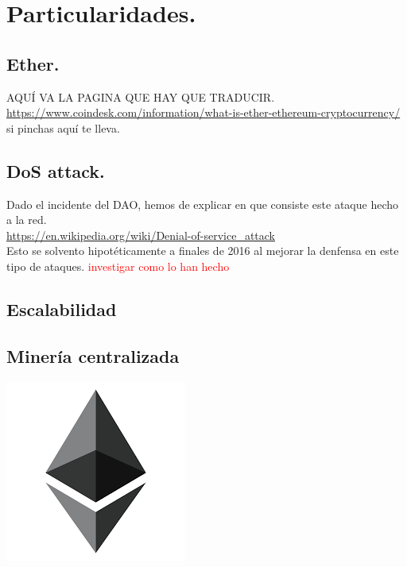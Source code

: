 \documentclass[11pt,a4paper]{article}
\begin{document}
\section{Particularidades.}

\subsection{Ether.}
\label{sec:ether}

AQUÍ VA LA PAGINA QUE HAY QUE TRADUCIR.	\\
\url{https://www.coindesk.com/information/what-is-ether-ethereum-cryptocurrency/}	\\
si pinchas aquí te lleva.

\subsection{DoS attack.}
Dado el incidente del DAO, hemos de explicar en que consiste este ataque hecho a la red.		 \\
\url{https://en.wikipedia.org/wiki/Denial-of-service_attack}\\
Esto se solvento hipotéticamente a finales de 2016 al mejorar la denfensa en este tipo de ataques. \textcolor{red}{investigar como lo han hecho}

\subsection{Escalabilidad}
\subsection{Minería centralizada}

\newpage
\begin{center}
	\includegraphics[scale=.42]{images/logo.png}
\end{center}

\tableofcontents
\end{document}
